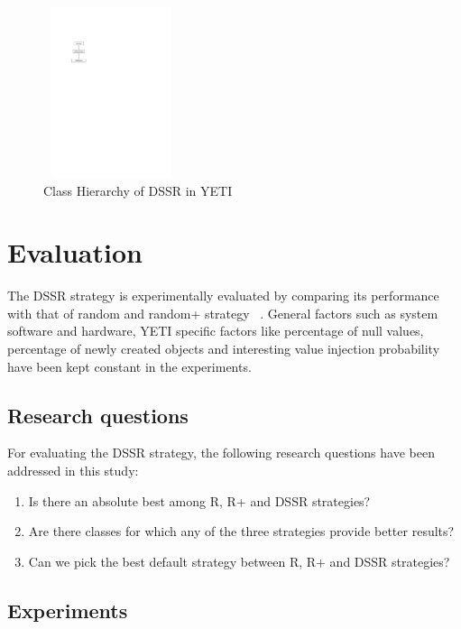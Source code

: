 \documentclass{acm_proc_article-sp}
\begin{document}
\begin{figure}[h]
\centering
\includegraphics[width=4cm,height=5cm]{hierarchy.pdf}
\caption{Class Hierarchy of DSSR in YETI}
\label{fig:hierarchyofDSSR}
\end{figure}







\section{Evaluation}\label{sec:eval}

The DSSR strategy is experimentally evaluated by comparing its performance with that of random and random+ strategy ~\cite{Leitner2007}. General factors such as system software and hardware, YETI specific factors like percentage of null values, percentage of newly created objects and interesting value injection probability have been kept constant in the experiments.

\subsection{Research questions}
For evaluating the DSSR strategy, the following research questions have been addressed in this study:
\begin{enumerate}
\item Is there an absolute best among R, R+ and DSSR strategies?
\item Are there classes for which any of the three strategies provide better results?
\item Can we pick the best default strategy between R, R+ and DSSR strategies?
\end{enumerate}



\subsection{Experiments}
\end{document}
